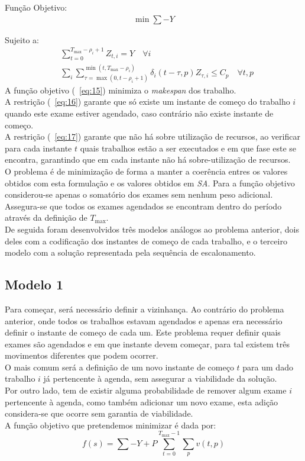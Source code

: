 Função Objetivo:
\begin{align}
\min \sum -Y \label{eq:15}
\end{align}

Sujeito a:
\begin{align}
&\sum^{T_{\max}-\rho_{i}+1}_{t=0}Z_{t,i} = Y \quad \forall i \label{eq:16} \\
&\sum_{i}\sum^{\min(t, T_{\max}-\rho_{i})}_{\tau=\max(0, t-\rho_{i}+1)}\delta_{i}(t-\tau,p)Z_{\tau,i} \leq C_{p} \quad \forall t,p \label{eq:17}
\end{align}
A função objetivo (~\ref{eq:15}) minimiza o \textit{makespan} dos trabalho.\\
A restrição (~\ref{eq:16}) garante que só existe um instante de começo do trabalho $i$ quando este exame estiver agendado, caso contrário não existe instante de começo.\\
A restrição (~\ref{eq:17}) garante que não há sobre utilização de recursos, ao verificar para cada instante $t$ quais trabalhos estão a ser executados e em que fase este se encontra, garantindo que em cada instante não há sobre-utilização de recursos.\\

O problema é de minimização de forma a manter a coerência entres os valores obtidos com esta formulação e os valores obtidos em \textit{SA}. Para a função objetivo considerou-se apenas o somatório dos exames sem nenhum peso adicional. Assegura-se que todos os exames agendados se encontram dentro do período através da definição de $T_{\max}$.\\

De seguida foram desenvolvidos três modelos análogos ao problema anterior, dois deles com a codificação dos instantes de começo de cada trabalho, e o terceiro modelo com a solução representada pela sequência de escalonamento.\\

\subsection{Modelo 1}

Para começar, será necessário definir a vizinhança. Ao contrário do problema anterior, onde todos os trabalhos estavam agendados e apenas era necessário definir o instante de começo de cada um. Este problema requer definir quais exames são agendados e em que instante devem começar, para tal existem três movimentos diferentes que podem ocorrer.\\
O mais comum será a definição de um novo instante de começo $t$ para um dado trabalho $i$ já pertencente à agenda, sem assegurar a viabilidade da solução.\\
Por outro lado, tem de existir alguma probabilidade de remover algum exame $i$ pertencente à agenda, como também adicionar um novo exame, esta adição considera-se que ocorre sem garantia de viabilidade.\\
A função objetivo que pretendemos minimizar é dada por:
$$f(s) = \sum -Y + P \sum_{t=0}^{T_{\max}-1}\sum_{p}v(t,p)$$

